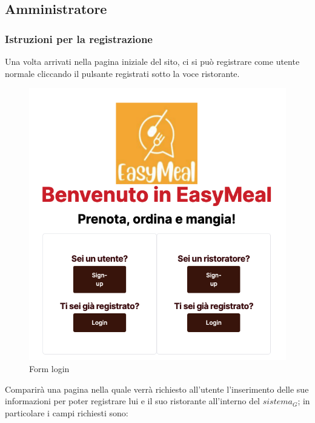 \newpage
\subsection{Amministratore}

\subsubsection{Istruzioni per la registrazione}

Una volta arrivati nella pagina iniziale del sito, ci si può registrare come utente normale cliccando il pulsante registrati sotto la voce ristorante.

\begin{figure}[H]
    \centering
    \includegraphics[width=0.5\linewidth]{img/schermata_iniziale.png}
    \caption{Form login}
    \label{fig:schermata_iniziale}
\end{figure}

Comparirà una pagina nella quale verrà richiesto all'utente l'inserimento delle sue informazioni per poter registrare lui e il suo ristorante all'interno del $\textit{sistema}_G$; in particolare i campi richiesti sono: 

